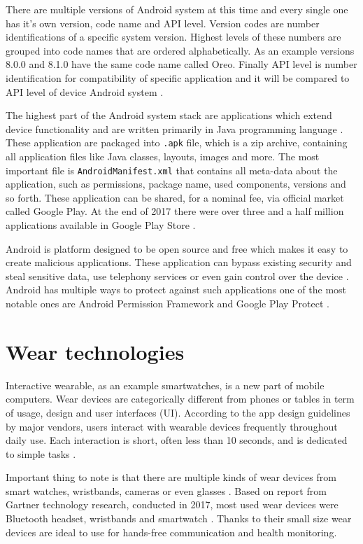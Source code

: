 There are multiple versions of Android system at this time and every single one has it's own version, code name and API level. Version codes are number identifications of a specific system version. Highest levels of these numbers are grouped into code names that are ordered alphabetically. As an example versions 8.0.0 and 8.1.0 have the same code name called Oreo. Finally API level is number identification for compatibility of specific application and it will be compared to API level of device Android system \cite{AOSP, AD}.

The highest part of the Android system stack are applications which extend device functionality and are written primarily in Java programming language \cite{SoASTaD}. These application are packaged into \verb|.apk| file, which is a zip archive, containing all application files like Java classes, layouts, images and more. The most important file is \verb|AndroidManifest.xml| that contains all meta-data about the application, such as permissions, package name, used components, versions and so forth. These application can be shared, for a nominal fee, via official market called Google Play. At the end of 2017 there were over three and a half million applications available in Google Play Store \cite{SoASTaD, NoAAiGPS, NoAA}.

Android is platform designed to be open source and free which makes it easy to create malicious applications. These application can bypass existing security and steal sensitive data, use telephony services or even gain control over the device \cite{ASIMPD}. Android has multiple ways to protect against such applications one of the most notable ones are Android Permission Framework and Google Play Protect \cite{SoASTaD}.


\section{Wear technologies}\label{sec:WearTechnologies}
Interactive wearable, as an example smartwatches, is a new part of mobile computers. Wear devices are categorically different from phones or tables in term of usage, design and user interfaces (UI). According to the app design guidelines by major vendors, users interact with wearable devices frequently throughout daily use. Each interaction is short, often less than 10 seconds, and is dedicated to simple tasks \cite{UtCoAWO}. 

Important thing to note is that there are multiple kinds of wear devices from smart watches, wristbands, cameras or even glasses \cite{MIWD}. Based on report from Gartner technology research, conducted in 2017, most used wear devices were Bluetooth headset, wristbands and smartwatch \cite{GSWWDS}. Thanks to their small size wear devices are ideal to use for hands-free communication and health monitoring.


